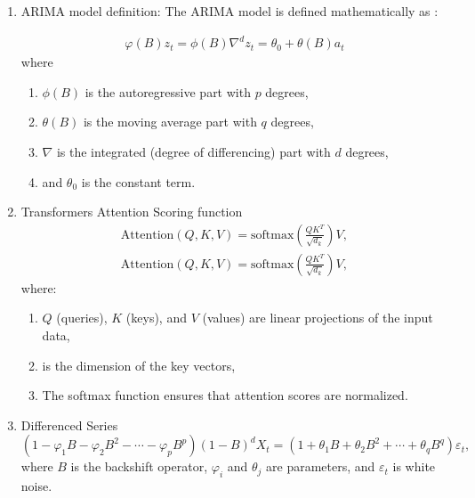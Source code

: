 \documentclass[12pt, letterpaper]{article}
\begin{document}
\begin{enumerate}
    \item ARIMA model definition:
    The ARIMA model is defined mathematically as \cite{box2015}:
    {\small
    \begin{align*}
        \varphi (B) z_t = \phi (B)\nabla^d z_t = \theta_0 + \theta (B)a_t
    \end{align*}
    where
    \begin{enumerate}[label=-]
        \item $\phi(B)$ is the autoregressive part with $p$ degrees,
        \item $\theta (B)$ is the moving average part with $q$ degrees,
        \item $\nabla$ is the integrated (degree of differencing) part with $d$ degrees,
        \item and $\theta_0$ is the constant term.
    \end{enumerate}
    }
    
    \item Transformers Attention Scoring function
    {\small \begin{align*} \text{Attention}(Q, K, V) = \text{softmax}\left(\frac{QK^T}{\sqrt{d_k}}\right)V, \end{align*} }
    {\small \begin{align*} \text{Attention}(Q, K, V) = \text{softmax}\left(\frac{QK^T}{\sqrt{d_k}}\right)V, \end{align*} }
    where:
    \begin{enumerate}[label=-] \item $Q$ (queries), $K$ (keys), and $V$ (values) are linear projections of the input data,
    \item  is the dimension of the key vectors,
    \item The softmax function ensures that attention scores are normalized.
    \end{enumerate}

    \item Differenced Series
    \[ (1 - \varphi_1 B - \varphi_2 B^2 - \cdots - \varphi_p B^p)(1-B)^d X_t = (1 + \theta_1 B + \theta_2 B^2 + \cdots + \theta_q B^q)\varepsilon_t, \] where \(B\) is the backshift operator, \(\varphi_i\) and \(\theta_j\) are parameters, and \(\varepsilon_t\) is white noise. 
    
\end{enumerate}

\printbibliography
\end{document}
